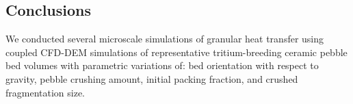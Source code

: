 

\subsection{Conclusions}
We conducted several microscale simulations of granular heat transfer using coupled CFD-DEM simulations of representative tritium-breeding ceramic pebble bed volumes with parametric variations of: bed orientation with respect to gravity, pebble crushing amount, initial packing fraction, and crushed fragmentation size.

